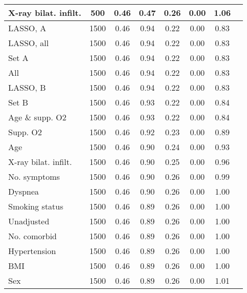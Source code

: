 \documentclass{article}
\begin{document}
{\begin{longtable}{lccccccc}
X-ray bilat. infilt. & 500 & 0.46 & 0.47 & 0.26 & 0.00 & 1.06\\ \midrule
LASSO, A & 1500 & 0.46 & 0.94 & 0.22 & 0.00 & 0.83\\
LASSO, all & 1500 & 0.46 & 0.94 & 0.22 & 0.00 & 0.83\\
Set A & 1500 & 0.46 & 0.94 & 0.22 & 0.00 & 0.83\\
All & 1500 & 0.46 & 0.94 & 0.22 & 0.00 & 0.83\\
LASSO, B & 1500 & 0.46 & 0.94 & 0.22 & 0.00 & 0.83\\
Set B & 1500 & 0.46 & 0.93 & 0.22 & 0.00 & 0.84\\
Age \& supp. O2 & 1500 & 0.46 & 0.93 & 0.22 & 0.00 & 0.84\\
Supp. O2 & 1500 & 0.46 & 0.92 & 0.23 & 0.00 & 0.89\\
Age & 1500 & 0.46 & 0.90 & 0.24 & 0.00 & 0.93\\
X-ray bilat. infilt. & 1500 & 0.46 & 0.90 & 0.25 & 0.00 & 0.96\\
No. symptoms & 1500 & 0.46 & 0.90 & 0.26 & 0.00 & 0.99\\
Dyspnea & 1500 & 0.46 & 0.90 & 0.26 & 0.00 & 1.00\\
Smoking status & 1500 & 0.46 & 0.89 & 0.26 & 0.00 & 1.00\\
Unadjusted & 1500 & 0.46 & 0.89 & 0.26 & 0.00 & 1.00\\
No. comorbid & 1500 & 0.46 & 0.89 & 0.26 & 0.00 & 1.00\\
Hypertension & 1500 & 0.46 & 0.89 & 0.26 & 0.00 & 1.00\\
BMI & 1500 & 0.46 & 0.89 & 0.26 & 0.00 & 1.00\\
Sex & 1500 & 0.46 & 0.89 & 0.26 & 0.00 & 1.01\\
\bottomrule
\hline
\end{longtable}
}

\clearpage
\end{document}
